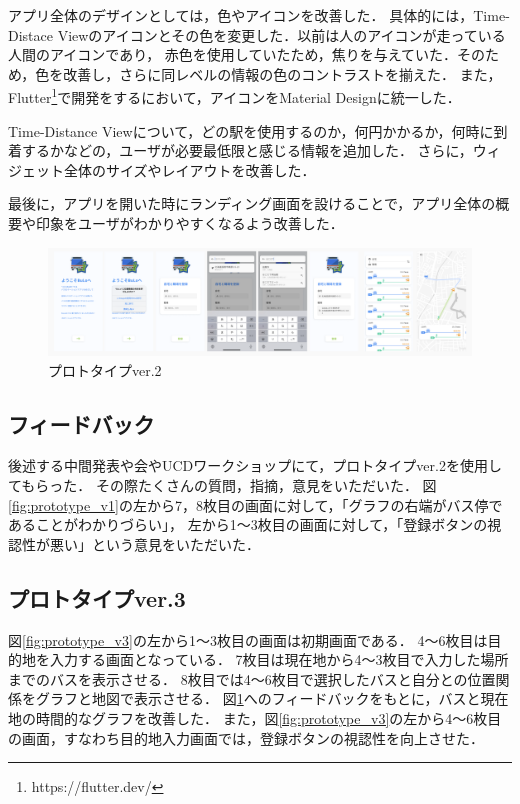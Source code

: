 アプリ全体のデザインとしては，色やアイコンを改善した．
具体的には，Time-Distace Viewのアイコンとその色を変更した．以前は人のアイコンが走っている人間のアイコンであり，
赤色を使用していたため，焦りを与えていた．そのため，色を改善し，さらに同レベルの情報の色のコントラストを揃えた．
また，Flutter\footnote{https://flutter.dev/}で開発をするにおいて，アイコンをMaterial Designに統一した．

Time-Distance Viewについて，どの駅を使用するのか，何円かかるか，何時に到着するかなどの，ユーザが必要最低限と感じる情報を追加した．
さらに，ウィジェット全体のサイズやレイアウトを改善した．

最後に，アプリを開いた時にランディング画面を設けることで，アプリ全体の概要や印象をユーザがわかりやすくなるよう改善した．

\begin{figure}[H]
    \centering
    \includegraphics[width=14cm]{images/prototype_v3.png}
    \caption{プロトタイプver.2}
    \label{fig:prototype_v2}
\end{figure}

\subsection{フィードバック}
後述する中間発表や会やUCDワークショップにて，プロトタイプver.2を使用してもらった．
その際たくさんの質問，指摘，意見をいただいた．
図\ref{fig:prototype_v1}の左から7，8枚目の画面に対して，「グラフの右端がバス停であることがわかりづらい」，
左から1〜3枚目の画面に対して，「登録ボタンの視認性が悪い」という意見をいただいた．

\subsection{プロトタイプver.3}
図\ref{fig:prototype_v3}の左から1〜3枚目の画面は初期画面である．
4〜6枚目は目的地を入力する画面となっている．
7枚目は現在地から4〜3枚目で入力した場所までのバスを表示させる．
8枚目では4〜6枚目で選択したバスと自分との位置関係をグラフと地図で表示させる．
図\ref{fig:prototype_v2}へのフィードバックをもとに，バスと現在地の時間的なグラフを改善した．
また，図\ref{fig:prototype_v3}の左から4〜6枚目の画面，すなわち目的地入力画面では，登録ボタンの視認性を向上させた．

